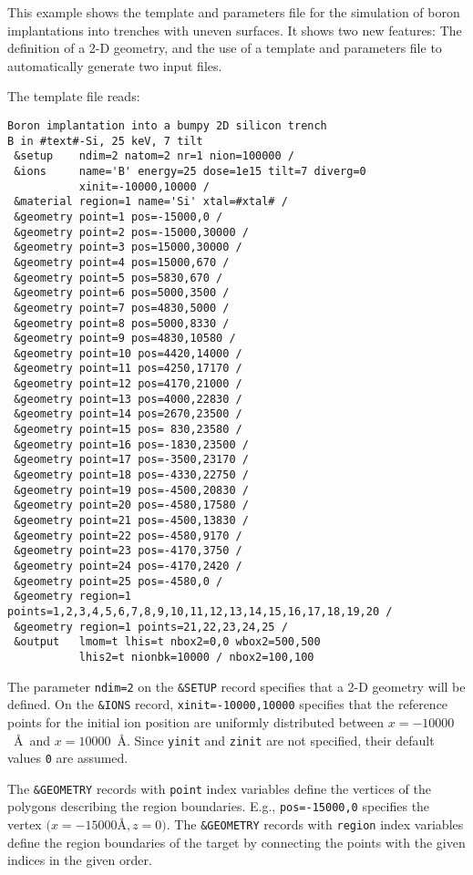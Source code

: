 This example shows the template and parameters file for the simulation of 
boron implantations into trenches with uneven surfaces. It shows two new
features: The definition of a 2-D geometry, and the use of a template and
parameters file to automatically generate two input files.

The template file reads:

\begin{verbatim}
Boron implantation into a bumpy 2D silicon trench
B in #text#-Si, 25 keV, 7 tilt
 &setup    ndim=2 natom=2 nr=1 nion=100000 /
 &ions     name='B' energy=25 dose=1e15 tilt=7 diverg=0
           xinit=-10000,10000 /
 &material region=1 name='Si' xtal=#xtal# /
 &geometry point=1 pos=-15000,0 /
 &geometry point=2 pos=-15000,30000 /
 &geometry point=3 pos=15000,30000 /
 &geometry point=4 pos=15000,670 /
 &geometry point=5 pos=5830,670 /
 &geometry point=6 pos=5000,3500 /
 &geometry point=7 pos=4830,5000 /
 &geometry point=8 pos=5000,8330 /
 &geometry point=9 pos=4830,10580 /
 &geometry point=10 pos=4420,14000 /
 &geometry point=11 pos=4250,17170 /
 &geometry point=12 pos=4170,21000 /
 &geometry point=13 pos=4000,22830 /
 &geometry point=14 pos=2670,23500 /
 &geometry point=15 pos= 830,23580 /
 &geometry point=16 pos=-1830,23500 /
 &geometry point=17 pos=-3500,23170 /
 &geometry point=18 pos=-4330,22750 /
 &geometry point=19 pos=-4500,20830 /
 &geometry point=20 pos=-4580,17580 /
 &geometry point=21 pos=-4500,13830 /
 &geometry point=22 pos=-4580,9170 /
 &geometry point=23 pos=-4170,3750 /
 &geometry point=24 pos=-4170,2420 /
 &geometry point=25 pos=-4580,0 /
 &geometry region=1 points=1,2,3,4,5,6,7,8,9,10,11,12,13,14,15,16,17,18,19,20 /
 &geometry region=1 points=21,22,23,24,25 /
 &output   lmom=t lhis=t nbox2=0,0 wbox2=500,500
           lhis2=t nionbk=10000 / nbox2=100,100
\end{verbatim}

The parameter \texttt{ndim=2} on the \texttt{\&SETUP} record specifies that a
2-D geometry will be defined. On the \texttt{\&IONS} record,
\texttt{xinit=-10000,10000} specifies that the reference points for the initial
ion position are uniformly distributed between $x=-10000$~\AA\ and
$x=10000$~\AA. Since \texttt{yinit} and \texttt{zinit} are not specified, their
default values \texttt{0} are assumed.

The \texttt{\&GEOMETRY} records with \texttt{point} index variables define the
vertices of the polygons describing the region boundaries. 
E.g., \texttt{pos=-15000,0} specifies the vertex $(x=-15000$\AA$, z=0)$. 
The \texttt{\&GEOMETRY} records with \texttt{region} index variables define the
region boundaries of the target by connecting the points with the given indices
in the given order.

